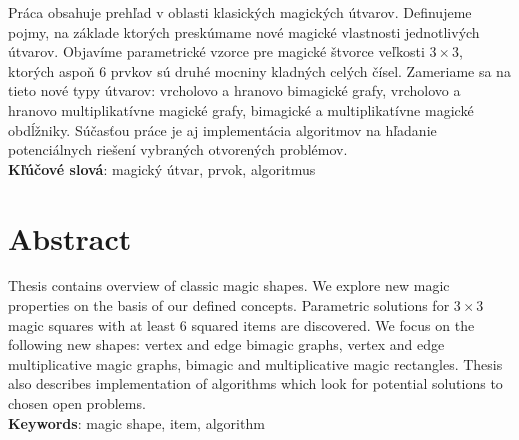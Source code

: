 \documentclass[12pt, twoside]{book}
\begin{document}
Práca obsahuje prehľad v oblasti klasických magických útvarov. Definujeme pojmy, na základe ktorých preskúmame nové magické vlastnosti jednotlivých útvarov. Objavíme parametrické vzorce pre magické štvorce veľkosti $3 \times 3$, ktorých aspoň $6$ prvkov sú druhé mocniny kladných celých čísel. Zameriame sa na tieto nové typy útvarov: vrcholovo a hranovo bimagické grafy, vrcholovo a hranovo multiplikatívne magické grafy, bimagické a multiplikatívne magické obdĺžniky. Súčasťou práce je aj implementácia algoritmov na hľadanie potenciálnych riešení vybraných otvorených problémov. \\

\textbf{Kľúčové slová}: magický útvar, prvok, algoritmus


\newpage 
\section*{Abstract}

Thesis contains overview of classic magic shapes. We explore new magic properties on the basis of our defined concepts. Parametric solutions for $3 \times 3$ magic squares with at least $6$ squared items are discovered. We focus on the following new shapes: vertex and edge bimagic graphs, vertex and edge multiplicative magic graphs, bimagic and multiplicative magic rectangles. Thesis also describes implementation of algorithms which look for potential solutions to chosen open problems. \\

\textbf{Keywords}: magic shape, item, algorithm


%
%



\newpage 
\end{document}
